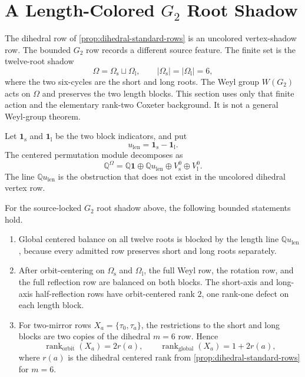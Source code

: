 \section{A Length-Colored \texorpdfstring{\(G_2\)}{G2} Root Shadow}
\label{sec:g2-source-channel}

The dihedral row of \cref{prop:dihedral-standard-rows} is an uncolored vertex-shadow row.  The bounded \(G_2\) row records a different source feature.  The finite set is the twelve-root shadow
\[
  \Omega=\Omega_{\mathrm{s}}\sqcup \Omega_{\mathrm{l}},
  \qquad |\Omega_{\mathrm{s}}|=|\Omega_{\mathrm{l}}|=6,
\]
where the two six-cycles are the short and long roots.  The Weyl group \(W(G_2)\) acts on \(\Omega\) and preserves the two length blocks.  This section uses only that finite action and the elementary rank-two Coxeter background\cite{BjornerBrenti2005}.  It is not a general Weyl-group theorem.

Let \(\mathbf 1_{\mathrm{s}}\) and \(\mathbf 1_{\mathrm{l}}\) be the two block indicators, and put
\[
  u_{\mathrm{len}}=\mathbf 1_{\mathrm{s}}-\mathbf 1_{\mathrm{l}}.
\]
The centered permutation module decomposes as
\[
  \mathbb Q^{\Omega}=\mathbb Q\mathbf 1\oplus \mathbb Q u_{\mathrm{len}}
    \oplus V_{\mathrm{s}}^0\oplus V_{\mathrm{l}}^0.
\]
The line \(\mathbb Q u_{\mathrm{len}}\) is the obstruction that does not exist in the uncolored dihedral vertex row.

\begin{proposition}
\label{prop:g2-source-channel}
For the source-locked \(G_2\) root shadow above, the following bounded statements hold.
\begin{enumerate}[label=\textup{(\alph*)},leftmargin=*]
  \item Global centered balance on all twelve roots is blocked by the length line \(\mathbb Q u_{\mathrm{len}}\), because every admitted row preserves short and long roots separately.
  \item After orbit-centering on \(\Omega_{\mathrm{s}}\) and \(\Omega_{\mathrm{l}}\), the full Weyl row, the rotation row, and the full reflection row are balanced on both blocks.  The short-axis and long-axis half-reflection rows have orbit-centered rank \(2\), one rank-one defect on each length block.
  \item For two-mirror rows \(X_a=\{\tau_0,\tau_a\}\), the restrictions to the short and long blocks are two copies of the dihedral \(m=6\) row.  Hence
  \[
    \operatorname{rank}_{\mathrm{orbit}}(X_a)=2r(a),
    \qquad
    \operatorname{rank}_{\mathrm{global}}(X_a)=1+2r(a),
  \]
  where \(r(a)\) is the dihedral centered rank from \cref{prop:dihedral-standard-rows} for \(m=6\).
\end{enumerate}
\end{proposition}

